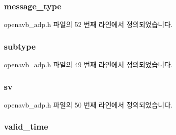 \subsubsection[{\texorpdfstring{message\+\_\+type}{message_type}}]{ message\+\_\+type}\hypertarget{structopenavb__adp__control__header__t_a5e8953d77df4508aa07ed906c5b19beb}{}\label{structopenavb__adp__control__header__t_a5e8953d77df4508aa07ed906c5b19beb}


openavb\+\_\+adp.\+h 파일의 52 번째 라인에서 정의되었습니다.

\subsubsection[{\texorpdfstring{subtype}{subtype}}]{ subtype}\hypertarget{structopenavb__adp__control__header__t_ad61c2796f8f447c2ca8979f4aeccf351}{}\label{structopenavb__adp__control__header__t_ad61c2796f8f447c2ca8979f4aeccf351}


openavb\+\_\+adp.\+h 파일의 49 번째 라인에서 정의되었습니다.

\subsubsection[{\texorpdfstring{sv}{sv}}]{ sv}\hypertarget{structopenavb__adp__control__header__t_adc62d14194c9ab3aff5b994caef8bcb0}{}\label{structopenavb__adp__control__header__t_adc62d14194c9ab3aff5b994caef8bcb0}


openavb\+\_\+adp.\+h 파일의 50 번째 라인에서 정의되었습니다.

\subsubsection[{\texorpdfstring{valid\+\_\+time}{valid_time}}]{ valid\+\_\+time}\hypertarget{structopenavb__adp__control__header__t_aebe5bad8aaf2356c644fc10e5c3f8fdf}{}\label{structopenavb__adp__control__header__t_aebe5bad8aaf2356c644fc10e5c3f8fdf}


